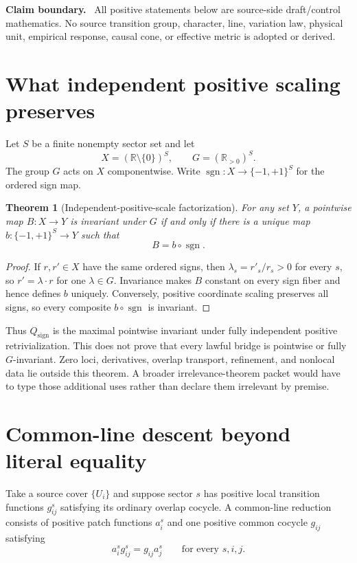 \documentclass[11pt]{article}
\newtheorem{theorem}{Theorem}
\newenvironment{boundary}{\par\smallskip\noindent\textbf{Claim boundary.}\ }{\par\smallskip}
\newcommand{\RR}{\mathbb R}
\newcommand{\Qsign}{Q_{\mathrm{sign}}}
\newcommand{\sgnmap}{\operatorname{sgn}}
\begin{document}
\begin{boundary}
All positive statements below are source-side draft/control mathematics.
No source transition group, character, line, variation law, physical unit,
empirical response, causal cone, or effective metric is adopted or derived.
\end{boundary}

\section{What independent positive scaling preserves}

Let $S$ be a finite nonempty sector set and let
\[
 X=(\RR\setminus\{0\})^S,
 \qquad G=(\RR_{>0})^S.
\]
The group $G$ acts on $X$ componentwise.  Write
$\sgnmap:X\to\{-1,+1\}^S$ for the ordered sign map.

\begin{theorem}[Independent-positive-scale factorization]
For any set $Y$, a pointwise map $B:X\to Y$ is invariant under $G$ if and
only if there is a unique map $b:\{-1,+1\}^S\to Y$ such that
\[
 B=b\circ\sgnmap.
\]
\end{theorem}

\begin{proof}
If $r,r'\in X$ have the same ordered signs, then
$\lambda_s=r'_s/r_s>0$ for every $s$, so $r'=\lambda\cdot r$ for one
$\lambda\in G$.  Invariance makes $B$ constant on every sign fiber and hence
defines $b$ uniquely.  Conversely, positive coordinate scaling preserves all
signs, so every composite $b\circ\sgnmap$ is invariant.
\end{proof}

Thus $\Qsign$ is the maximal pointwise invariant under fully independent
positive retrivialization.  This does not prove that every lawful bridge is
pointwise or fully $G$-invariant.  Zero loci, derivatives, overlap transport,
refinement, and nonlocal data lie outside this theorem.  A broader
irrelevance-theorem packet would have to type those additional uses rather
than declare them irrelevant by premise.

\section{Common-line descent beyond literal equality}

Take a source cover $\{U_i\}$ and suppose sector $s$ has positive local
transition functions $g^s_{ij}$ satisfying its ordinary overlap cocycle.  A
common-line reduction consists of positive patch functions $a^s_i$ and one
positive common cocycle $g_{ij}$ satisfying
\begin{equation}\label{eq:reduction}
 a^s_i g^s_{ij}=g_{ij}a^s_j
 \qquad\text{for every }s,i,j.
\end{equation}
\end{document}
